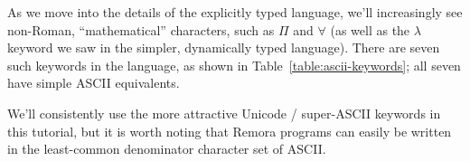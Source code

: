 As we move into the details of the explicitly typed language,
we'll increasingly see non-Roman, ``mathematical'' characters,
such as $\Pi$ and $\forall$
(as well as the $\lambda$ keyword we saw
in the simpler, dynamically typed language).
There are seven such keywords in the language, 
as shown in Table~\ref{table:ascii-keywords};
all seven have simple ASCII equivalents.
\begin{table}
\begin{center}
\end{center}
\caption{Remora has seven core forms whose identifying keywords
use non-ASCII Unicode characters; all have ASCII equivalents.}
\label{table:ascii-keywords}
\end{table}
We'll consistently use the more attractive Unicode / super-ASCII keywords 
in this tutorial,
but it is worth noting that Remora programs can easily be written
in the least-common denominator character set of ASCII\@.


